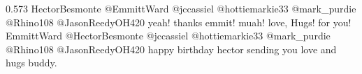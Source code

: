 {0.573}
{\joinNameTweet
{HectorBesmonte}
{@EmmittWard @jccassiel @hottiemarkie33 @mark\_purdie @Rhino108 @JasonReedyOH420 yeah! thanks emmit! muah! love, Hugs! for you!}}
{\joinNameTweet
{EmmittWard}
{@HectorBesmonte @jccassiel @hottiemarkie33 @mark\_purdie @Rhino108 @JasonReedyOH420 happy birthday hector sending you love and hugs buddy.}}
%
%
%
%
%
%
%
%
%
